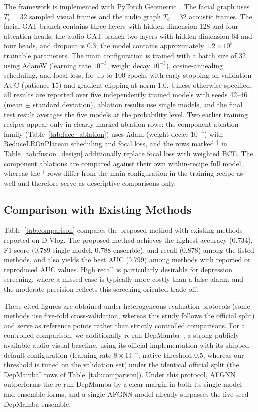 \documentclass[conference]{IEEEtran}
\begin{document}
The framework is implemented with PyTorch Geometric~\cite{fey2019fast}. The facial graph uses \(T_v=32\) sampled visual frames and the audio graph \(T_a=32\) acoustic frames. The facial GAT branch contains three layers with hidden dimension 128 and four attention heads, the audio GAT branch two layers with hidden dimension 64 and four heads, and dropout is 0.3; the model contains approximately \(1.2 \times 10^5\) trainable parameters. The main configuration is trained with a batch size of 32 using AdamW (learning rate \(10^{-3}\), weight decay \(10^{-3}\)), cosine-annealing scheduling, and focal loss, for up to 100 epochs with early stopping on validation AUC (patience 15) and gradient clipping at norm 1.0. Unless otherwise specified, all results are reported over five independently trained models with seeds 42--46 (mean $\pm$ standard deviation), ablation results use single models, and the final test result averages the five models at the probability level. Two earlier training recipes appear only in clearly marked ablation rows: the component-ablation family (Table~\ref{tab:face_ablation}) uses Adam (weight decay \(10^{-4}\)) with ReduceLROnPlateau scheduling and focal loss, and the rows marked \(^\ddagger\) in Table~\ref{tab:fusion_design} additionally replace focal loss with weighted BCE. The component ablations are compared against their own within-recipe full model, whereas the \(^\ddagger\) rows differ from the main configuration in the training recipe as well and therefore serve as descriptive comparisons only.

\subsection{Comparison with Existing Methods}

Table~\ref{tab:comparison} compares the proposed method with existing methods reported on D-Vlog. The proposed method achieves the highest accuracy (0.734), F1-score (0.789 single model, 0.788 ensemble), and recall (0.878) among the listed methods, and also yields the best AUC (0.799) among methods with reported or reproduced AUC values. High recall is particularly desirable for depression screening, where a missed case is typically more costly than a false alarm, and the moderate precision reflects this screening-oriented trade-off.

These cited figures are obtained under heterogeneous evaluation protocols (some methods use five-fold cross-validation, whereas this study follows the official split) and serve as reference points rather than strictly controlled comparisons. For a controlled comparison, we additionally re-ran DepMamba~\cite{model:DepMamba}, a strong publicly available audio-visual baseline, using its official implementation with its shipped default configuration (learning rate $8\times10^{-5}$; native threshold 0.5, whereas our threshold is tuned on the validation set) under the identical official split (the DepMamba$^\dagger$ rows of Table~\ref{tab:comparison}). Under this protocol, AFGNN outperforms the re-run DepMamba by a clear margin in both its single-model and ensemble forms, and a single AFGNN model already surpasses the five-seed DepMamba ensemble.
\end{document}

